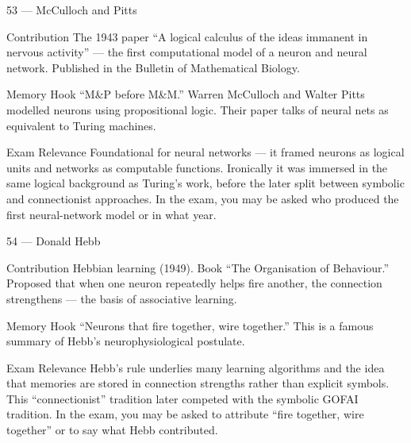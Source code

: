 \documentclass[aspectratio=169,8pt]{beamer}
\begin{document}
	\begin{frame}{53 --- McCulloch and Pitts}
		\begin{block}{Contribution}
			The 1943 paper ``A logical calculus of the ideas immanent in nervous activity'' --- the first computational model of a neuron and neural network. Published in the Bulletin of Mathematical Biology.
		\end{block}
		\begin{block}{Memory Hook}
			``M\&P before M\&M.'' Warren McCulloch and Walter Pitts modelled neurons using propositional logic. Their paper talks of neural nets as equivalent to Turing machines.
		\end{block}
		\begin{block}{Exam Relevance}
			Foundational for neural networks --- it framed neurons as logical units and networks as computable functions. Ironically it was immersed in the same logical background as Turing's work, before the later split between symbolic and connectionist approaches. In the exam, you may be asked who produced the first neural-network model or in what year.
		\end{block}
	\end{frame}
	
	\begin{frame}{54 --- Donald Hebb}
		\begin{block}{Contribution}
			Hebbian learning (1949). Book ``The Organisation of Behaviour.'' Proposed that when one neuron repeatedly helps fire another, the connection strengthens --- the basis of associative learning.
		\end{block}
		\begin{block}{Memory Hook}
			``Neurons that fire together, wire together.'' This is a famous summary of Hebb's neurophysiological postulate.
		\end{block}
		\begin{block}{Exam Relevance}
			Hebb's rule underlies many learning algorithms and the idea that memories are stored in connection strengths rather than explicit symbols. This ``connectionist'' tradition later competed with the symbolic GOFAI tradition. In the exam, you may be asked to attribute ``fire together, wire together'' or to say what Hebb contributed.
		\end{block}
	\end{frame}
	
\end{document}
